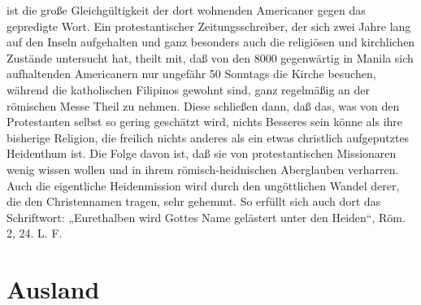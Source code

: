 ist die große Gleichgültigkeit der dort wohnenden Americaner gegen das gepredigte Wort. Ein protestantischer Zeitungsschreiber, der sich zwei Jahre lang auf den Inseln aufgehalten und ganz besonders auch die religiösen und kirchlichen Zustände untersucht hat, theilt mit, daß von den 8000 gegenwärtig in Manila sich aufhaltenden Americanern nur ungefähr 50 Sonntags die Kirche besuchen, während die katholischen Filipinos gewohnt sind, ganz regelmäßig an der römischen Messe Theil zu nehmen. Diese schließen dann, daß das, was von den Protestanten selbst so gering geschätzt wird, nichts Besseres sein könne als ihre bisherige Religion, die freilich nichts anderes als ein etwas christlich aufgeputztes Heidenthum ist. Die Folge davon ist, daß sie von protestantischen Missionaren wenig wissen wollen und in ihrem römisch-heidnischen Aberglauben verharren. Auch die eigentliche Heidenmission wird durch den ungöttlichen Wandel derer, die den Christennamen tragen, sehr gehemmt. So erfüllt sich auch dort das Schriftwort: „Eurethalben wird Gottes Name gelästert unter den Heiden“, Röm. 2, 24. L. F.

\section{Ausland}

